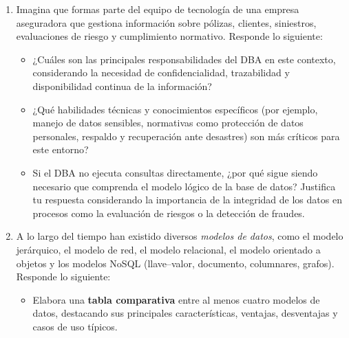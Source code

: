 \documentclass[12pt]{report}
\begin{document}
\begin{enumerate}[label=\textbf{\arabic*.}, leftmargin=*]
\begin{enumerate}[label=\textbf{\alph*.}, leftmargin=*, itemsep=1.0em]
 \hspace{0.3cm}\textbf{Ejemplo:} Pudiera ser el caso en donde tengamos a una misma persona registrada dos veces en la Base de Datos, puede que difieran en un campo/dato como el correo pero sigue siendo la misma persona y, por ende, guardando todos los demas datos dos veces (nombre, id, direccion, etc), lo que puede generar más costos no deseados en el almacenamiento si esta situacion sudece más veces.

 Ahora bien, la \textbf{redundancia No Controlada} puede generar inconsistencia y ser negativo para la integridad de los datos puesto que, como comentabamos antes en el ejemplo, puede tenerse más de una vez un mismo dato lo cual podría llevar a que al momento de querer modificarlo tiene que sincronizarse con los demas lugares en los que aparece pues si no se hace entonces perderiamos la consistencia en los datos y también perderiamos la integridad puesto que el dato puede llegar a tener distintos valores. Por esto mismo suele haber problemas cuando se trata de redundancia no controlada, pues viene consigo el degradamiento de rendimiento y aumente los costos con respecto al almacenamiento en la Base de Datos.


\item Imagina que formas parte del equipo de tecnolog\'ia de una empresa aseguradora que gestiona informaci\'on sobre p\'olizas, clientes, siniestros, evaluaciones de riesgo y cumplimiento normativo. Responde lo siguiente:
\begin{itemize}
  \item ¿Cu\'ales son las principales responsabilidades del DBA en este contexto, considerando la necesidad de confidencialidad, trazabilidad y disponibilidad continua de la informaci\'on?
  \item ¿Qu\'e habilidades t\'ecnicas y conocimientos espec\'ificos (por ejemplo, manejo de datos sensibles, normativas como protecci\'on de datos personales, respaldo y recuperaci\'on ante desastres) son m\'as cr\'iticos para este entorno?
  \item Si el DBA no ejecuta consultas directamente, ¿por qu\'e sigue siendo necesario que comprenda el modelo l\'ogico de la base de datos? Justifica tu respuesta considerando la importancia de la integridad de los datos en procesos como la evaluaci\'on de riesgos o la detecci\'on de fraudes.
\end{itemize}

\item A lo largo del tiempo han existido diversos \textit{modelos de datos}, como el modelo jer\'arquico, el modelo de red, el modelo relacional, el modelo orientado a objetos y los modelos NoSQL (llave--valor, documento, columnares, grafos). Responde lo siguiente:
\begin{itemize}
  \item Elabora una \textbf{tabla comparativa} entre al menos cuatro modelos de datos, destacando sus principales caracter\'isticas, ventajas, desventajas y casos de uso t\'ipicos.


\end{itemize}
\end{enumerate}
\end{enumerate}
\end{document}
